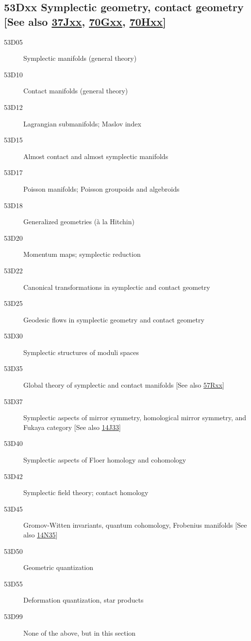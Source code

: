 \subsection*{53Dxx  Symplectic geometry, contact geometry [See also \hyperref[37Jxx]{37Jxx}, \hyperref[70Gxx]{70Gxx}, \hyperref[70Hxx]{70Hxx}] }\label{53Dxx}
\begin{description}  
\item [53D05]\label{53D05} Symplectic manifolds (general theory)
\item [53D10]\label{53D10} Contact manifolds (general theory)
\item [53D12]\label{53D12} Lagrangian submanifolds; Maslov index
\item [53D15]\label{53D15} Almost contact and almost symplectic manifolds
\item [53D17]\label{53D17} Poisson manifolds; Poisson groupoids and algebroids
\item [53D18]\label{53D18} Generalized geometries (\`{a} la Hitchin)
\item [53D20]\label{53D20} Momentum maps; symplectic reduction 
\item [53D22]\label{53D22} Canonical transformations in symplectic and contact geometry
\item [53D25]\label{53D25} Geodesic flows in symplectic geometry and contact geometry
\item [53D30]\label{53D30} Symplectic structures of moduli spaces
\item [53D35]\label{53D35} Global theory of symplectic and contact manifolds [See also \hyperref[57Rxx]{57Rxx}]
\item [53D37]\label{53D37} Symplectic aspects of mirror symmetry, homological mirror symmetry, and Fukaya category [See also \hyperref[14J33]{14J33}]
\item [53D40]\label{53D40} Symplectic aspects of Floer homology and cohomology
\item [53D42]\label{53D42} Symplectic field theory; contact homology
\item [53D45]\label{53D45} Gromov-Witten invariants, quantum cohomology, Frobenius manifolds [See also \hyperref[14N35]{14N35}]
\item [53D50]\label{53D50} Geometric quantization
\item [53D55]\label{53D55} Deformation quantization, star products
\item [53D99]\label{53D99} None of the above, but in this section
\end{description}
